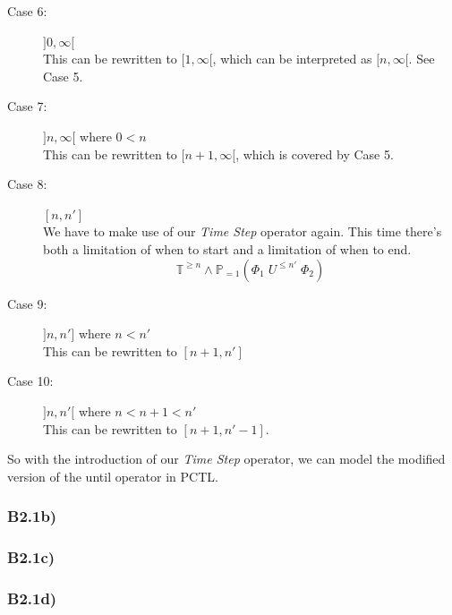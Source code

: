 \documentclass[12pt]{report}
\begin{document}
\begin{description}
	\item[Case 6:] $]0, \infty[$\\
	This can be rewritten to $[1, \infty[$, which can be interpreted as $[n, \infty[$. See Case 5.
	
	\item[Case 7:] $]n, \infty[$ where $0 < n$\\
	This can be rewritten to $[n+1, \infty[$, which is covered by Case 5.
	
	\item[Case 8:] $[n, n']$\\
	We have to make use of our \emph{Time Step} operator again. This time there's both a limitation of when to start and a limitation of when to end.
	$$\mathbb{T}^{\geqslant n} \wedge \mathbb{P}_{=1}\left(\Phi_1\;U^{\leqslant n'}\;\Phi_2\right)$$
	
	\item[Case 9:] $]n, n']$ where $n < n'$\\
	This can be rewritten to $[n+1, n']$
	
	\item[Case 10:] $]n, n'[$ where $n < n + 1 < n'$\\
	This can be rewritten to $[n+1, n'-1]$.
\end{description}

So with the introduction of our \emph{Time Step} operator, we can model the modified version of the until operator in PCTL.

\subsubsection*{B2.1b)}
\subsubsection*{B2.1c)}
\subsubsection*{B2.1d)}
\end{document}
